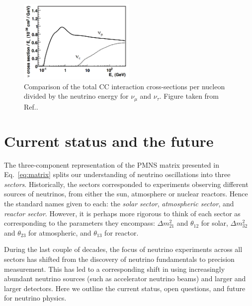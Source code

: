 \begin{figure} %
    \includegraphics[origin=c,width=0.5\textwidth]{diagrams/3-theory/tau_comparison.png}
    \caption[Total charged-current cross-section of $\nu_{\mu}$ and $\nu_{\tau}$]
    {Comparison of the total CC interaction cross-sections per nucleon divided by the neutrino
        energy for $\nu_{\mu}$ and $\nu_{\tau}$. Figure taken from Ref.\cite{formaggio2012}.}
    \label{fig:tau_comparison}
\end{figure}

\section{Current status and the future} %
\label{sec:theory_status} %

The three-component representation of the PMNS matrix presented in Eq.~\ref{eq:matrix} splits our
understanding of neutrino oscillations into three \emph{sectors}. Historically, the sectors
corresponded to experiments observing different sources of neutrinos, from either the sun,
atmosphere or nuclear reactors. Hence the standard names given to each: the \emph{solar sector},
\emph{atmospheric sector}, and \emph{reactor sector}. However, it is perhaps more rigorous to
think of each sector as corresponding to the parameters they encompass: $\Delta m^{2}_{21}$ and
$\theta_{12}$ for solar, $\Delta m^{2}_{32}$ and $\theta_{23}$ for atmospheric, and $\theta_{13}$
for reactor.

During the last couple of decades, the focus of neutrino experiments across all sectors has
shifted from the discovery of neutrino fundamentals to precision measurement. This has led to a
corresponding shift in using increasingly abundant neutrino sources (such as accelerator neutrino
beams) and larger and larger detectors. Here we outline the current status, open questions, and
future for neutrino physics.

